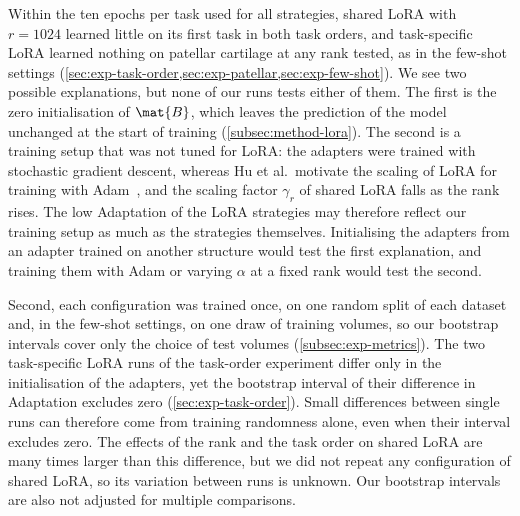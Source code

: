 Within the ten epochs per task used for all strategies, shared LoRA with $r = 1024$ learned little on its first task in both task orders, and task-specific LoRA learned nothing on patellar cartilage at any rank tested, as in the few-shot settings (\cref{sec:exp-task-order,sec:exp-patellar,sec:exp-few-shot}).
We see two possible explanations, but none of our runs tests either of them.
The first is the zero initialisation of $\mat{B}$, which leaves the prediction of the model unchanged at the start of training (\cref{subsec:method-lora}).
The second is a training setup that was not tuned for LoRA: the adapters were trained with stochastic gradient descent, whereas Hu et al.\ motivate the scaling of LoRA for training with Adam~\cite[Sec.~4.1]{hu2022lora}, and the scaling factor $\gamma_r$ of shared LoRA falls as the rank rises.
The low Adaptation of the LoRA strategies may therefore reflect our training setup as much as the strategies themselves.
Initialising the adapters from an adapter trained on another structure would test the first explanation, and training them with Adam or varying $\alpha$ at a fixed rank would test the second.

Second, each configuration was trained once, on one random split of each dataset and, in the few-shot settings, on one draw of training volumes, so our bootstrap intervals cover only the choice of test volumes (\cref{subsec:exp-metrics}).
The two task-specific LoRA runs of the task-order experiment differ only in the initialisation of the adapters, yet the bootstrap interval of their difference in Adaptation excludes zero (\cref{sec:exp-task-order}).
Small differences between single runs can therefore come from training randomness alone, even when their interval excludes zero.
The effects of the rank and the task order on shared LoRA are many times larger than this difference, but we did not repeat any configuration of shared LoRA, so its variation between runs is unknown.
Our bootstrap intervals are also not adjusted for multiple comparisons.

